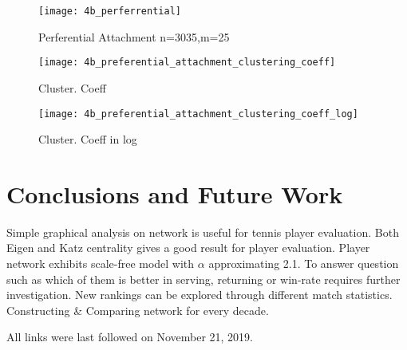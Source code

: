 \documentclass[runningheads]{llncs}
\begin{document}
\begin{figure}
\texttt{[image: 4b\_perferrential]}
\caption{Perferential Attachment n=3035,m=25} \label{fig_4b_perferrential}
\end{figure}

\begin{figure}
    \centering
    \begin{minipage}{0.5\textwidth}
        \centering
        \texttt{[image: 4b\_preferential\_attachment\_clustering\_coeff]} %
        \caption{Cluster. Coeff}
        \label{fig_4b_preferential_attachment_clustering_coeff}
    \end{minipage}\hfill
    \begin{minipage}{0.5\textwidth}
        \centering
        \texttt{[image: 4b\_preferential\_attachment\_clustering\_coeff\_log]} %
        \caption{ Cluster. Coeff in log}
        \label{fig_4b_preferential_attachment_clustering_coeff_log}
    \end{minipage}
\end{figure}


\section{Conclusions and Future Work}

Simple graphical analysis on network is useful for tennis player evaluation.
Both Eigen and Katz centrality gives a good result for player evaluation.
Player network exhibits scale-free model with $\alpha $ approximating 2.1.
To answer question such as which of them is better in serving, returning or win-rate requires further investigation. New rankings can be explored through different match statistics. Constructing & Comparing network for every decade.
%
%



All links were last followed on November 21, 2019.
\end{document}
